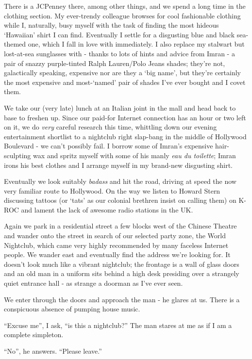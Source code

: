 \documentclass[a5paper,titlepage,11pt]{book}
\begin{document}
There is a JCPenney there, among other things, and we spend a long time in the clothing section.  My ever-trendy colleague browses for cool fashionable clothing while I, naturally, busy myself with the task of finding the most hideous `Hawaiian' shirt I can find.  Eventually I settle for a disgusting blue and black sea-themed one, which I fall in love with immediately.  I also replace my stalwart but lost-at-sea sunglasses with - thanks to lots of hints and advice from Imran - a pair of snazzy purple-tinted Ralph Lauren/Polo Jeans shades; they're not, galactically speaking, expensive nor are they a `big name', but they're certainly the most expensive and most-`named' pair of shades I've ever bought and I covet them.

We take our (very late) lunch at an Italian joint in the mall and head back to base to freshen up.  Since our paid-for Internet connection has an hour or two left on it, we do \emph{very} careful research this time, whittling down our evening entertainment shortlist to a nightclub right slap-bang in the middle of Hollywood Boulevard - we can't possibly fail.  I borrow some of Imran's expensive hair-sculpting wax and spritz myself with some of his manly \emph{eau du toilette}; Imran irons his best clothes and I arrange myself in my brand-new disgusting shirt.

Eventually we look suitably \emph{badass} and hit the road, driving at speed the now very familiar route to Hollywood.  On the way we listen to Howard Stern discussing tattoos (or `tats' as our colonial brethren insist on calling them) on K-ROC and lament the lack of awesome radio stations in the UK.

Again we park in a residential street a few blocks west of the Chinese Theatre and wander onto the street in search of our selected party zone, the World Nightclub, which came very highly recommended by many faceless Internet people.  We wander east and eventually find the address we're looking for.  It doesn't look much like a vibrant nightclub; the frontage is a wall of glass doors and an old man in a uniform sits behind a high desk presiding over a strangely quiet entrance hall - as strange a doorman as I've ever seen.

We enter through the doors and approach the man - he glares at us.  There is a conspicuous absence of pumping house music.

``Excuse me'', I ask, ``is this a nightclub?''  The man stares at me as if I am a complete simpleton.

``No'', he answers.  ``Please leave.''
\end{document}
